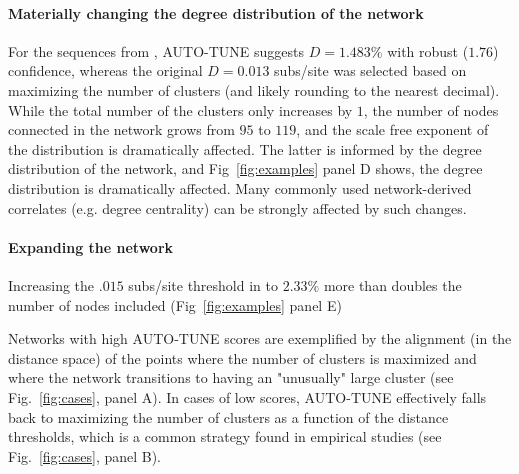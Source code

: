 \documentclass[utf8]{FrontiersinHarvard} %
\newcommand{\TODO}[1]{{\color{red}{#1}}}
\begin{document}
\paragraph{Materially changing the degree distribution of the network}  For the sequences from \citet{Li:2022aa}, AUTO-TUNE suggests $D = 1.483\%$ with
robust ($1.76$) confidence, whereas the original $D = 0.013$ subs/site was selected based
on maximizing the number of clusters (and likely rounding to the nearest
decimal). While the total number of the clusters only increases by $1$, the
number of nodes connected in the network grows from $95$ to $119$, and the
scale free exponent of the distribution is dramatically affected. The latter
is informed by the degree distribution of the network, and
Fig~\ref{fig:examples} panel D shows, the degree distribution is dramatically
affected. Many commonly used network-derived correlates (e.g. degree centrality) can
be strongly affected by such changes.

\paragraph{Expanding the network}  Increasing the $.015$ subs/site threshold in \citet{Billings:2019aa} to $2.33\%$ more
than doubles the number of nodes included (Fig~\ref{fig:examples} panel E)

Networks with high AUTO-TUNE scores are exemplified by the alignment (in the
distance space) of the points where the number of clusters is maximized and
where the network transitions to having an "unusually" large cluster (see
Fig.~\ref{fig:cases}, panel A). In cases of low scores, AUTO-TUNE effectively
falls back to maximizing the number of clusters as a function of the distance
thresholds, which is a common strategy found in empirical studies (see
Fig.~\ref{fig:cases}, panel B).

\TODO{ VDC: is there a cutoff to consider the score to be low or high?  Does it mean that even in low scoring cases, AUTO-TUNE is a good option to tune the threshold?}
\end{document}
